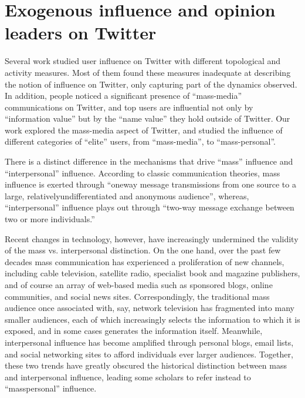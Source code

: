 \documentclass[phd,tocprelim]{cornell}
\begin{document}
\chapter{Exogenous influence and opinion leaders on Twitter}
\label{chap:influece}
Several work studied user influence on Twitter with different topological and activity measures\cite{kwak_10,Cha-2010,weng_10}. Most of them found these measures inadequate at describing the notion of influence on Twitter, only capturing part of the dynamics observed. In addition, people noticed a significant presence of ``mass-media'' communications on Twitter\cite{kwak_10}, and top users are influential not only by ``information value'' but by the ``name value'' they hold outside of Twitter\cite{Cha-2010}. Our work explored the mass-media aspect of Twitter, and studied the influence of different categories of ``elite'' users, from ``mass-media'', to ``mass-personal''.

There is a distinct difference in the mechanisms that drive ``mass'' influence and ``interpersonal'' influence. According to classic communication theories, mass influence is exerted through ``oneway message transmissions from one source to a large,  relativelyundifferentiated and anonymous audience'', whereas, ``interpersonal'' influence plays out through ``two-way message exchange between two or more individuals.''




Recent changes in technology, however, have increasingly undermined the validity of the mass vs. interpersonal distinction.  On the one hand, over the past few decades mass communication has experienced a proliferation of new channels, including cable television, satellite radio, specialist book and magazine publishers, and of course an array of web-based media such as sponsored blogs, online communities, and social news sites. Correspondingly, the traditional mass audience once associated with, say, network television
has fragmented into many smaller audiences, each of which increasingly selects the information to which it is exposed, and in some cases generates the information itself.  Meanwhile, interpersonal influence has become amplified through personal blogs, email lists, and social networking sites to afford individuals ever larger audiences. Together, these two trends have greatly obscured the historical distinction between mass and interpersonal influence, leading some scholars to refer instead to
``masspersonal'' influence\cite{walther_10}.
\end{document}
